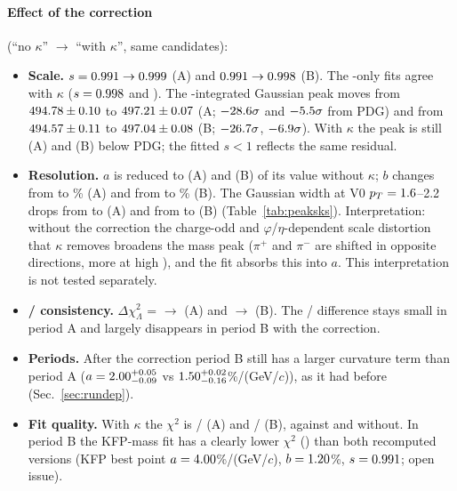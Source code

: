 \paragraph{Effect of the correction} (``no $\kappa$'' $\to$ ``with $\kappa$'', same candidates):
\begin{itemize}
\item \textbf{Scale.} $s=0.991\to0.999$ (A) and $0.991\to0.998$ (B). The \La-only fits agree with
  $\kappa$ ($s=0.998$ and \PerBKapLaS). The \pt-integrated \Ks{} Gaussian peak moves from
  $494.78\pm0.10$ to $497.21\pm0.07$\mevcc{} (A; $-28.6\sigma$ and
  $-5.5\sigma$ from PDG) and from $494.57\pm0.11$ to $497.04\pm0.08$\mevcc{} (B;
  $-26.7\sigma$, $-6.9\sigma$). With $\kappa$ the \Ks{} peak is still \PerAKapKsBelow{} (A) and \PerBKapKsBelow\mevcc{} (B) below PDG; the fitted
  $s<1$ reflects the same residual.
\item \textbf{Resolution.} $a$ is reduced to \PerAARatio{} (A) and \PerBARatio{} (B) of its value without $\kappa$; $b$ changes from
  \PerARawKsB{} to \PerAKapKsB\% (A) and from \PerBRawKsB{} to \PerBKapKsB\% (B). The \Ks{} Gaussian width at V0 $p_T=1.6$--2.2\gevc{} drops from \PerARawKsWidHigh{} to
  \PerAKapKsWidHigh\mevcc{} (A) and from \PerBRawKsWidHigh{} to \PerBKapKsWidHigh\mevcc{} (B) (Table~\ref{tab:peaksks}).
  Interpretation: without the correction the charge-odd and $\varphi$/$\eta$-dependent scale distortion that $\kappa$ removes
  broadens the mass peak ($\pi^+$ and $\pi^-$ are shifted in opposite directions, more at high \pt), and the fit absorbs this into
  $a$. This interpretation is not tested separately.
\item \textbf{\Ks/\La{} consistency.} $\Delta\chi^2_\Lambda$ = \PerARawDchiLa{} $\to$ \PerAKapDchiLa{} (A) and \PerBRawDchiLa{}
  $\to$ \PerBKapDchiLa{} (B). The \Ks/\La{} difference stays small in period A and largely disappears in period B with the correction.
\item \textbf{Periods.} After the correction period B still has a larger curvature term than period A
  ($a=2.00^{+0.05}_{-0.09}$ vs $1.50^{+0.02}_{-0.16}$\%/(GeV/$c$)), as it had
  before (Sec.~\ref{sec:rundep}).
\item \textbf{Fit quality.} With $\kappa$ the \Ks{} $\chi^2$ is \PerAKapKsChi/\PerAKapKsNdf{} (A) and \PerBKapKsChi/\PerBKapKsNdf{}
  (B), against \PerARawKsChi{} and \PerBRawKsChi{} without. In period B the KFP-mass fit has a clearly lower $\chi^2$
  (\PerBKfpKsChi) than both recomputed versions (KFP best point $a=4.00$\%/(GeV/$c$), $b=1.20$\%, $s=0.991$; open issue).
\end{itemize}

